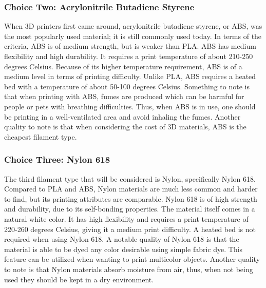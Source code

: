 \documentclass[letterpaper, onecolumn, draftclsnofoot, 10pt, compsoc]{IEEEtran}
\begin{document}
\begin{singlespace}
\subsubsection{Choice Two: Acrylonitrile Butadiene Styrene}
When 3D printers first came around, acrylonitrile butadiene styrene, or ABS, was the most popularly used material; it is still commonly used today. 
In terms of the criteria, ABS is of medium strength, but is weaker than PLA.
ABS has medium flexibility and high durability.
It requires a print temperature of about 210-250 degrees Celsius.
Because of its higher temperature requirement, ABS is of a medium level in terms of printing difficulty. 
Unlike PLA, ABS requires a heated bed with a temperature of about 50-100 degrees Celsius.
Something to note is that when printing with ABS, fumes are produced which can be harmful for people or pets with breathing difficulties.
Thus, when ABS is in use, one should be printing in a well-ventilated area and avoid inhaling the fumes. 
Another quality to note is that when considering the cost of 3D materials, ABS is the cheapest filament type. \cite{filamentweb}
\subsubsection{Choice Three: Nylon 618}
The third filament type that will be considered is Nylon, specifically Nylon 618. 
Compared to PLA and ABS, Nylon materials are much less common and harder to find, but its printing attributes are comparable.
Nylon 618 is of high strength and durability, due to its self-bonding properties. 
The material itself comes in a natural white color. 
It has high flexibility and requires a print temperature of 220-260 degrees Celsius, giving it a medium print difficulty. 
A heated bed is not required when using Nylon 618.
A notable quality of Nylon 618 is that the material is able to be dyed any color desirable using simple fabric dye. 
This feature can be utilized when wanting to print multicolor objects. 
Another quality to note is that Nylon materials absorb moisture from air, thus, when not being used they should be kept in a dry environment. \cite{filamentweb}


\end{singlespace}
\end{document}
